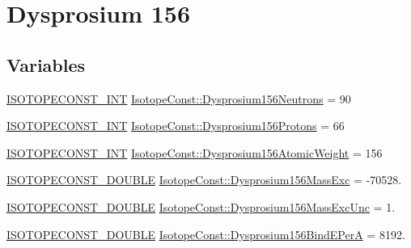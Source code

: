 \hypertarget{group___isotope_const-_dysprosium-_dy156}{}\section{Dysprosium 156}
\label{group___isotope_const-_dysprosium-_dy156}
\subsection*{Variables}
\begin{DoxyCompactItemize}
\item 
\mbox{\hyperlink{group___isotope_const-_macros_ga5f18360b3e99483a35c32d789e62621c}{I\+S\+O\+T\+O\+P\+E\+C\+O\+N\+S\+T\+\_\+\+I\+NT}} \mbox{\hyperlink{group___isotope_const-_dysprosium-_dy156_ga1bc414bcfdb3dd632ad0eaf86ac42311}{Isotope\+Const\+::\+Dysprosium156\+Neutrons}} = 90
\item 
\mbox{\hyperlink{group___isotope_const-_macros_ga5f18360b3e99483a35c32d789e62621c}{I\+S\+O\+T\+O\+P\+E\+C\+O\+N\+S\+T\+\_\+\+I\+NT}} \mbox{\hyperlink{group___isotope_const-_dysprosium-_dy156_ga0890c9061245cc1f326a0abd3d90bc5a}{Isotope\+Const\+::\+Dysprosium156\+Protons}} = 66
\item 
\mbox{\hyperlink{group___isotope_const-_macros_ga5f18360b3e99483a35c32d789e62621c}{I\+S\+O\+T\+O\+P\+E\+C\+O\+N\+S\+T\+\_\+\+I\+NT}} \mbox{\hyperlink{group___isotope_const-_dysprosium-_dy156_ga6c47d7867ac5d1bbfea57867edf4c14e}{Isotope\+Const\+::\+Dysprosium156\+Atomic\+Weight}} = 156
\item 
\mbox{\hyperlink{group___isotope_const-_macros_ga8f45a7272ce02c0b4c65c44636ed719a}{I\+S\+O\+T\+O\+P\+E\+C\+O\+N\+S\+T\+\_\+\+D\+O\+U\+B\+LE}} \mbox{\hyperlink{group___isotope_const-_dysprosium-_dy156_ga12c9792cb08207b6642d47be5b868377}{Isotope\+Const\+::\+Dysprosium156\+Mass\+Exc}} = -\/70528.
\item 
\mbox{\hyperlink{group___isotope_const-_macros_ga8f45a7272ce02c0b4c65c44636ed719a}{I\+S\+O\+T\+O\+P\+E\+C\+O\+N\+S\+T\+\_\+\+D\+O\+U\+B\+LE}} \mbox{\hyperlink{group___isotope_const-_dysprosium-_dy156_ga905d03397078940f54368459c4d5d33a}{Isotope\+Const\+::\+Dysprosium156\+Mass\+Exc\+Unc}} = 1.
\item 
\mbox{\hyperlink{group___isotope_const-_macros_ga8f45a7272ce02c0b4c65c44636ed719a}{I\+S\+O\+T\+O\+P\+E\+C\+O\+N\+S\+T\+\_\+\+D\+O\+U\+B\+LE}} \mbox{\hyperlink{group___isotope_const-_dysprosium-_dy156_gaed27817b010313065b76d1453addafb6}{Isotope\+Const\+::\+Dysprosium156\+Bind\+E\+PerA}} = 8192.

\end{DoxyCompactItemize}
